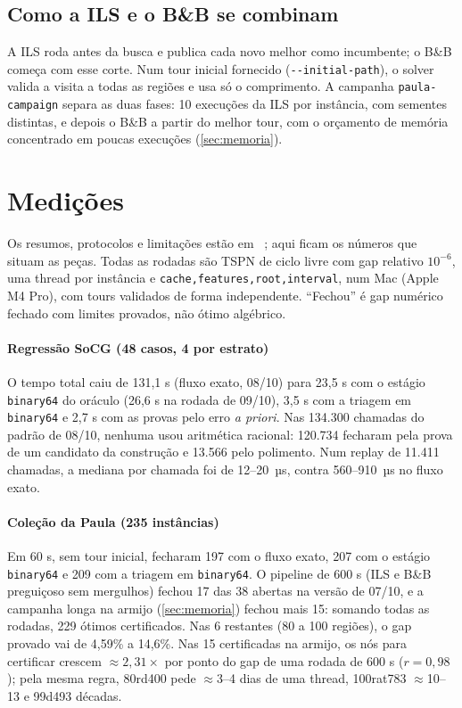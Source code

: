 \documentclass[11pt,a4paper]{article}
\theoremstyle{plain}\newtheorem{proposicao}{Proposição}
\theoremstyle{definition}\newtheorem{definicao}{Definição}
\theoremstyle{plain}\newtheorem{teorema}{Teorema}
\theoremstyle{plain}\newtheorem{lema}{Lema}
\newcommand{\code}[1]{\texttt{\small #1}}
\begin{document}
\subsection{Como a ILS e o B\&B se combinam}
A ILS roda antes da busca e publica cada novo melhor como incumbente; o B\&B começa com esse corte. Num tour inicial fornecido (\code{-{}-initial-path}), o solver valida a visita a todas as regiões e usa só o comprimento. A campanha \code{paula-campaign} separa as duas fases: 10 execuções da ILS por instância, com sementes distintas, e depois o B\&B a partir do melhor tour, com o orçamento de memória concentrado em poucas execuções (\cref{sec:memoria}).

\section{Medições}\label{sec:medicoes}
Os resumos, protocolos e limitações estão em ~\cite{resultados}; aqui ficam os números que situam as peças. Todas as rodadas são TSPN de ciclo livre com gap relativo \(10^{-6}\), uma thread por instância e \code{cache,features,root,interval}, num Mac (Apple M4 Pro), com tours validados de forma independente. ``Fechou'' é gap numérico fechado com limites provados, não ótimo algébrico.

\paragraph{Regressão SoCG (48 casos, 4 por estrato)} O tempo total caiu de 131,1 s (fluxo exato, 08/10) para 23,5 s com o estágio \texttt{binary64} do oráculo (26,6 s na rodada de 09/10), 3,5 s com a triagem em \texttt{binary64} e 2,7 s com as provas pelo erro \emph{a priori}. Nas 134.300 chamadas do padrão de 08/10, nenhuma usou aritmética racional: 120.734 fecharam pela prova de um candidato da construção e 13.566 pelo polimento. Num replay de 11.411 chamadas, a mediana por chamada foi de 12–20~µs, contra 560–910~µs no fluxo exato.

\paragraph{Coleção da Paula (235 instâncias)} Em 60 s, sem tour inicial, fecharam 197 com o fluxo exato, 207 com o estágio \texttt{binary64} e 209 com a triagem em \texttt{binary64}. O pipeline de 600 s (ILS e B\&B preguiçoso sem mergulhos) fechou 17 das 38 abertas na versão de 07/10, e a campanha longa na armijo (\cref{sec:memoria}) fechou mais 15: somando todas as rodadas, 229 ótimos certificados. Nas 6 restantes (80 a 100 regiões), o gap provado vai de 4,59\% a 14,6\%. Nas 15 certificadas na armijo, os nós para certificar crescem \(\approx 2{,}31\times\) por ponto do gap de uma rodada de 600 s (\(r=0{,}98\)); pela mesma regra, 80rd400 pede \(\approx\)3--4 dias de uma thread, 100rat783 \(\approx\)10--13 e 99d493 décadas.
\end{document}

